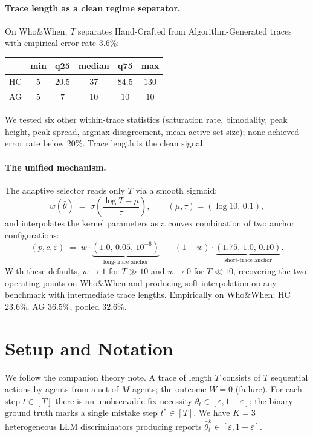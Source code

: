 \documentclass[11pt]{article}
\newcommand{\thetahat}{\hat{\theta}}
\begin{document}
\paragraph{Trace length as a clean regime separator.}
On Who\&When, $T$ separates Hand-Crafted from Algorithm-Generated traces
with empirical error rate $3.6\%$:
\begin{center}
\small
\begin{tabular}{lccccc}
\toprule
& min & q25 & median & q75 & max \\
\midrule
HC & $5$ & $20.5$ & $37$ & $84.5$ & $130$ \\
AG & $5$ & $7$ & $10$ & $10$ & $10$ \\
\bottomrule
\end{tabular}
\end{center}
We tested six other within-trace statistics (saturation rate, bimodality,
peak height, peak spread, argmax-disagreement, mean active-set size); none
achieved error rate below $20\%$. Trace length is the clean signal.

\paragraph{The unified mechanism.}
The adaptive selector reads only $T$ via a smooth sigmoid:
\[
w(\thetahat) \;=\; \sigma\!\left(\frac{\log T - \mu}{\tau}\right),
\qquad
(\mu, \tau) = (\log 10,\, 0.1),
\]
and interpolates the kernel parameters as a convex combination of two
anchor configurations:
\[
(p, c, \varepsilon) \;=\; w \cdot \underbrace{(1.0,\, 0.05,\, 10^{-6})}_{\text{long-trace anchor}}
\;+\; (1 - w) \cdot \underbrace{(1.75,\, 1.0,\, 0.10)}_{\text{short-trace anchor}}.
\]
With these defaults, $w \to 1$ for $T \gg 10$ and $w \to 0$ for $T \ll 10$,
recovering the two operating points on Who\&When and producing soft
interpolation on any benchmark with intermediate trace lengths. Empirically
on Who\&When: HC $23.6\%$, AG $36.5\%$, pooled $32.6\%$.

\section{Setup and Notation}

We follow the companion theory note. A trace of length $T$ consists of
$T$ sequential actions by agents from a set of $M$ agents; the outcome
$W = 0$ (failure). For each step $t \in [T]$ there is an unobservable fix
necessity $\theta_t \in [\varepsilon, 1{-}\varepsilon]$; the binary ground
truth marks a single mistake step $t^* \in [T]$. We have $K = 3$
heterogeneous LLM discriminators producing reports
$\thetahat^k_t \in [\varepsilon, 1{-}\varepsilon]$.
\end{document}
